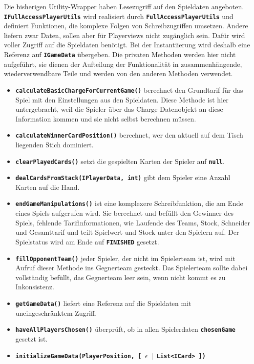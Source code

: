 \documentclass[
							a4paper, 
							11pt, 
							openany, 
							liststotoc,
							parskip=half, 
   							headings=normal
						]{scrreprt}
\begin{document}
{Die bisherigen Utility-Wrapper haben Lesezugriff auf den Spieldaten angeboten. \textbf{\texttt{IFull\-Ac\-cess\-Pla\-yer\-Ut\-ils}} wird realisiert durch \textbf{\texttt{FullAccessPlayerUtils}} und definiert Funktionen, die komplexe Folgen von Schreibzugriffen umsetzen. Andere liefern zwar Daten, sollen aber für Playerviews nicht zugänglich sein.
Dafür wird voller Zugriff auf die Spieldaten benötigt. Bei der Instantiierung wird deshalb eine Referenz auf \textbf{\texttt{IGameData}} übergeben. Die privaten Methoden werden hier nicht aufgeführt, sie dienen der Aufteilung der Funktionalität in zusammenhängende, wiederverwendbare Teile und werden von den anderen Methoden verwendet.
\begin{itemize}
	\item \textbf{\texttt{calculateBasicChargeForCurrentGame()}} berechnet den Grundtarif für das Spiel mit den Einstellungen aus den Spieldaten. Diese Methode ist hier untergebracht, weil die Spieler über das Charge Datenobjekt an diese Information kommen und sie nicht selbst berechnen müssen.
	\item \textbf{\texttt{calculateWinnerCardPosition()}} berechnet, wer den aktuell auf dem Tisch liegenden Stich dominiert.
	\item \textbf{\texttt{clearPlayedCards()}} setzt die gespielten Karten der Spieler auf \textbf{\texttt{null}}.
	\item \textbf{\texttt{dealCardsFromStack(IPlayerData, int)}} gibt dem Spieler eine Anzahl Karten auf die Hand.
	\item \textbf{\texttt{endGameManipulations()}} ist eine komplexere Schreibfunktion, die am Ende eines Spiels aufgerufen wird. Sie berechnet und befüllt den Gewinner des Spiels, fehlende Tarifinformationen, wie Laufende des Teams, Stock, Schneider und Gesamttarif und teilt Spielwert und Stock unter den Spielern auf. Der Spielstatus wird am Ende auf \textbf{\texttt{FINISHED}} gesetzt.
	\item \textbf{\texttt{fillOpponentTeam()}} jeder Spieler, der nicht im Spielerteam ist, wird mit Aufruf dieser Methode ins Gegnerteam gesteckt. Das Spielerteam sollte dabei vollständig befüllt, das Gegnerteam leer sein, wenn nicht kommt es zu Inkonsistenz.
	\item \textbf{\texttt{getGameData()}} liefert eine Referenz auf die Spieldaten mit uneingeschränktem Zugriff.
	\item \textbf{\texttt{haveAllPlayersChosen()}} überprüft, ob in allen Spielerdaten \textbf{\texttt{chosenGame}} gesetzt ist.
	\item \textbf{\texttt{initializeGameData(PlayerPosition, [ $\epsilon$ $\mid$ List{\textless}ICard{\textgreater} ])}} \newline 

\end{itemize}}
\end{document}
